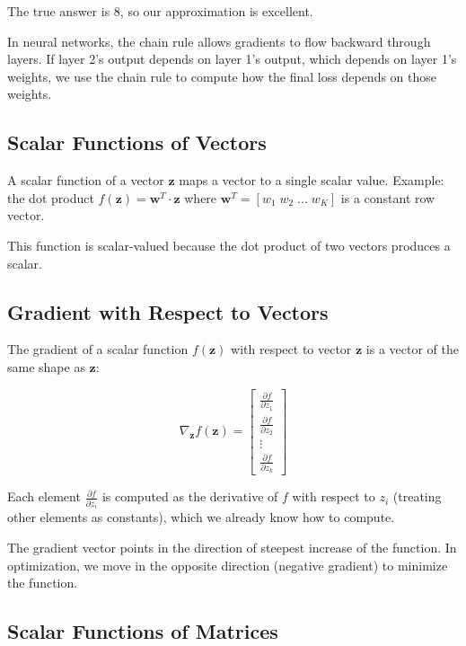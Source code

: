 \documentclass{book}
\begin{document}
The true answer is $8$, so our approximation is excellent.

In neural networks, the chain rule allows gradients to flow backward through layers. If layer 2's output depends on layer 1's output, which depends on layer 1's weights, we use the chain rule to compute how the final loss depends on those weights.

\subsection{Scalar Functions of Vectors}
\label{sec:scalar-vector-function}

A scalar function of a vector $\mathbf{z}$ maps a vector to a single scalar value. Example: the dot product $f(\mathbf{z}) = \mathbf{w}^T \cdot \mathbf{z}$ where $\mathbf{w}^T = [w_1 \; w_2 \; ... \; w_K]$ is a constant row vector.

This function is scalar-valued because the dot product of two vectors produces a scalar.

\subsection{Gradient with Respect to Vectors}

The gradient of a scalar function $f(\mathbf{z})$ with respect to vector $\mathbf{z}$ is a vector of the same shape as $\mathbf{z}$:

\begin{equation}
\nabla_{\mathbf{z}} f(\mathbf{z}) = \begin{bmatrix}
\frac{\partial f}{\partial z_1} \\
\frac{\partial f}{\partial z_2} \\
\vdots \\
\frac{\partial f}{\partial z_k}
\end{bmatrix}
\end{equation}

Each element $\frac{\partial f}{\partial z_i}$ is computed as the derivative of $f$ with respect to $z_i$ (treating other elements as constants), which we already know how to compute.

The gradient vector points in the direction of steepest increase of the function. In optimization, we move in the opposite direction (negative gradient) to minimize the function.

\subsection{Scalar Functions of Matrices}
\end{document}
